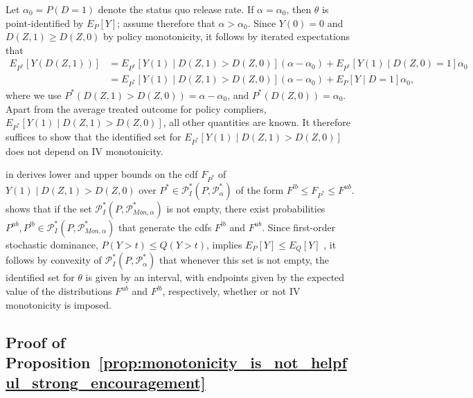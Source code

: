 \documentclass[12pt]{article}%
\theoremstyle{definition}
\newcommand\1{\operatorname{I}\indicatorfence}
\begin{document}
\begin{appendices}
Let $\alpha_0=P(D=1)$ denote the status quo release rate. If $\alpha=\alpha_0$,
then $\theta$ is point-identified by $E_{P}[Y]$; assume therefore that
$\alpha>\alpha_0$. Since $Y(0)=0$ and $D(Z,1)\geq D(Z,0)$ by policy
monotonicity, it follows by iterated expectations that
\begin{equation*}
  \begin{split}
    E_{P^*}[Y(D(Z,1))]
    &=E_{P^*}[Y(1) \mid D(Z,1) > D(Z,0)] (\alpha-\alpha_{0}) + E_{P^*}[Y(1) \mid
      D(Z,0)=1]\alpha_{0}\\
    & =E_{P^*}[Y(1) \mid D(Z,1) > D(Z,0)] (\alpha-\alpha_{0}) + E_{P}[Y \mid D=1]\alpha_{0},
  \end{split}
\end{equation*}
where we use $P^{*}(D(Z,1)>D(Z,0))=\alpha-\alpha_{0}$, and
$P^{*}(D(Z,0))=\alpha_{0}$. Apart from the average treated outcome for policy
compliers, $E_{P^*}[Y(1) \mid D(Z,1) > D(Z,0)]$, all other quantities are known.
It therefore suffices to show that the identified set for
$E_{P^*}[Y(1) \mid D(Z,1) > D(Z,0)]$ does not depend on IV monotonicity.

 in  derives lower
and upper bounds on the cdf $F_{P^{*}}$ of $Y(1) \mid D(Z,1) > D(Z,0)$ over
$P^{*}\in\mathcal{P}_{I}^{*}(P, \mathcal{P}^{*}_{\alpha})$ of the form
$F^{lb} \leq F_{P^{*}} \leq F^{ub}$.
 shows that if the set
$\mathcal{P}_{I}^{*}(P, \mathcal{P}^{*}_{Mon, \alpha})$ is not empty, there
exist probabilities
$P^{ub}, P^{lb}\in \mathcal{P}_{I}^{*}(P, \mathcal{P}^{*}_{Mon, \alpha})$ that
generate the cdfs $F^{lb}$ and $F^{ub}$. Since first-order stochastic dominance,
$P(Y>t)\leq Q(Y>t)$, implies $E_{P}[Y]\leq E_{Q}[Y]$
\parencite[e.g.][Proposition A.2, p.~694]{MaOl11}, it follows by convexity of
$\mathcal{P}_{I}^{*}(P, \mathcal{P}^{*}_{\alpha})$ that whenever this set is not
empty, the identified set for $\theta$ is given by an interval, with endpoints
given by the expected value of the distributions $F^{ub}$ and $F^{lb}$,
respectively, whether or not IV monotonicity is imposed.

\subsection{Proof of Proposition~\ref{prop:monotonicity_is_not_helpful_strong_encouragement}}


\end{appendices}
\end{document}
